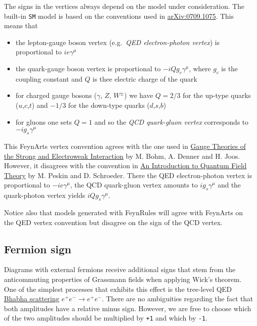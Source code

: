 \documentclass[../FeynCalcManual.tex]{subfiles}
\begin{document}
The signs in the vertices always depend on the model under
consideration. The built-in \texttt{SM} model is based on the
conventions used in
\href{https://arxiv.org/abs/0709.1075v1}{arXiv:0709.1075}. This means
that

\begin{itemize}
\tightlist
\item
  the lepton-gauge boson vertex (e.g.~\emph{QED electron-photon vertex})
  is proportional to \(i e \gamma^\mu\)
\item
  the quark-gauge boson vertex is proportional to
  \(- i Q g_c \gamma^\mu\), where \(g_c\) is the coupling constant and
  \(Q\) is thee electric charge of the quark
\item
  for charged gauge bosons (\(\gamma\), \(Z\), \(W^{\pm}\)) we have
  \(Q = 2/3\) for the up-type quarks (\(u\),\(c\),\(t\)) and \(-1/3\)
  for the down-type quarks (\(d\),\(s\),\(b\))
\item
  for gluons one sets \(Q=1\) and so the \emph{QCD quark-gluon vertex}
  corresponds to \(- i g_s \gamma^\mu\)
\end{itemize}

This FeynArts vertex convention agrees with the one used in
\href{https://doi.org/10.1007/978-3-322-80160-9}{Gauge Theories of the
Strong and Electroweak Interaction} by M. Bohm, A. Denner and H. Joos.
However, it disagrees with the convention in
\href{https://doi.org/10.1201/9780429503559}{An Introduction to Quantum
Field Theory} by M. Peskin and D. Schroeder. There the QED
electron-photon vertex is proportional to \(- i e \gamma^\mu\), the QCD
quark-gluon vertex amounts to \(i g_s \gamma^\mu\) and the quark-photon
vertex yields \(i Q g_s \gamma^\mu\).

Notice also that models generated with FeynRules will agree with
FeynArts on the QED vertex convention but disagree on the sign of the
QCD vertex.

\hypertarget{fermion-sign}{%
\subsection{Fermion sign}\label{fermion-sign}}

Diagrams with external fermions receive additional signs that stem from
the anticommuting properties of Grassmann fields when applying Wick's
theorem. One of the simplest processes that exhibits this effect is the
tree-level QED
\href{https://en.wikipedia.org/wiki/Bhabha_scattering}{Bhabha
scattering} \(e^+ e^- \to e^+ e^-\). There are no ambiguities regarding
the fact that both amplitudes have a relative minus sign. However, we
are free to choose which of the two amplitudes should be multiplied by
\texttt{+1} and which by \texttt{-1}.
\end{document}
